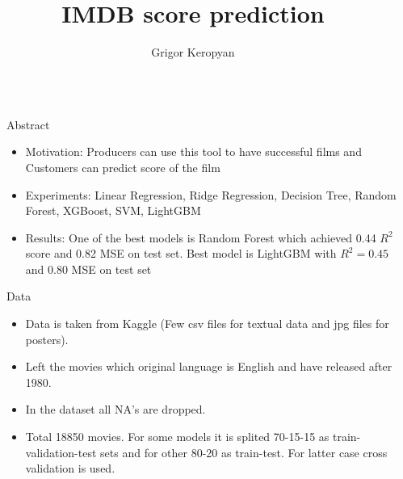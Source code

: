 \documentclass[final]{beamer}
\title{IMDB score prediction} %
\author{Grigor Keropyan} %
\institute{Department of Mathematics and Mechanics at Yerevan State University\\[0.5cm] \url{goqorkeropyan@gmail.com}} %
\newlength{\sepwid}
\newlength{\onecolwid}
\begin{document}

\setlength{\belowcaptionskip}{2ex} %
\setlength\belowdisplayshortskip{2ex} %

\begin{frame}[t] %

\begin{columns}[t] %

\begin{column}{\sepwid}\end{column} %

\begin{column}{\onecolwid} %


\begin{alertblock}{Abstract}
\begin{itemize}
\item Motivation:
Producers can use this tool to have successful films and
Customers can predict score of the film

\item Experiments:
Linear Regression, Ridge Regression, Decision Tree, Random Forest, XGBoost, 
SVM, LightGBM

\item Results:
One of the best models is Random Forest which achieved 0.44 $R^2$ score and 0.82 MSE on test set. 
Best model is LightGBM with $R^2 = 0.45$ and 0.80 MSE  on test set 

\end{itemize}
\end{alertblock}


\begin{block}{Data}
\begin{itemize}
\item Data is taken from Kaggle (Few csv files for textual data and jpg files for posters).
\item Left the movies which original language is English and have released after 1980.
\item In the dataset all NA's are dropped.
\item Total 18850 movies. For some models it is splited 70-15-15 as train-validation-test sets and for other 80-20 as train-test. For latter case cross validation is used.


\end{itemize}
\end{block}
\end{column}
\end{columns}
\end{frame}
\end{document}
